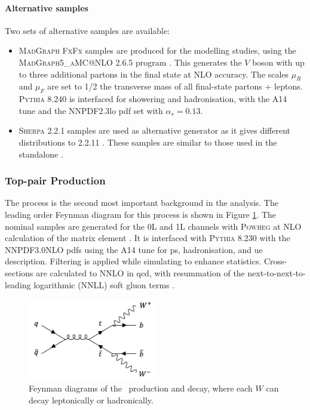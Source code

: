 \paragraph{Alternative samples} Two sets of alternative samples are available:
\begin{itemize}
  \item \textsc{MadGraph FxFx} samples are produced for the modelling studies, using the \textsc{MadGraph5\_aMC@NLO} 2.6.5 program \cite{madgraph}. This generates the $V$ boson with up to three additional partons in the final state at NLO accuracy. The scales $\mu_R$ and $\mu_F$ are set to 1/2 the transverse mass of all final-state partons + leptons. \textsc{Pythia} 8.240 is interfaced for showering and hadronisation, with the A14 tune and the NNPDF2.3lo \gls{pdf} set with $\alpha_s = 0.13$.
  \item \textsc{Sherpa} 2.2.1 \cite{sherpa2.2paper} samples are used as alternative generator as it gives different \ptv distributions to 2.2.11 \cite{simVjet}. These samples are similar to those used in the standalone \vhc \cite{Collaboration:2721696}.
\end{itemize}

\subsubsection{Top-pair Production}\label{subsec-vh-top-samples}
The \ttb process is the second most important background in the analysis. The leading order Feynman diagram for this process is shown in Figure \ref{fig:feynttb}. The nominal samples are generated for the 0L and 1L channels with \textsc{Powheg} at NLO calculation of the matrix element \cite{StefanoFrixione_2007, PaoloNason_2004}. It is interfaced with \textsc{Pythia} 8.230 with the NNPDF3.0NLO \gls{pdf}s using the A14 tune for \gls{ps}, hadronisation, and \gls{ue} description. Filtering is applied while simulating to enhance statistics. Cross-sections are calculated to NNLO in \gls{qcd}, with resummation of the next-to-next-to-leading logarithmic (NNLL) soft gluon terms \cite{CZAKON20142930}.

\begin{figure}[h!]
  \center
  \includegraphics[width=0.5\textwidth]{Images/VH/Feynman/ttb.png}
  \caption{Feynman diagrams of the \ttb\ production and decay, where each $W$ can decay leptonically or hadronically.} 
  \label{fig:feynttb}
\end{figure}

